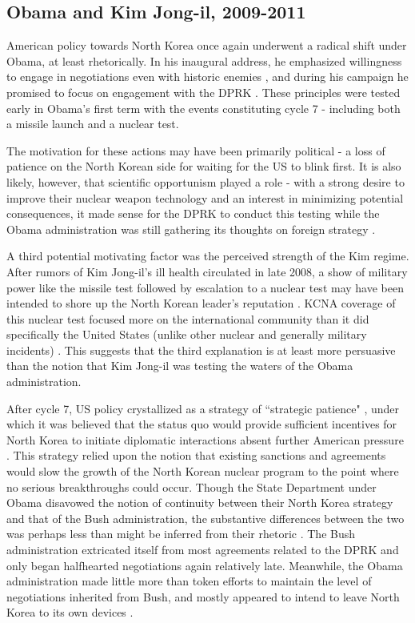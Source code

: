 \documentclass{article}
\begin{document}
\subsection{Obama and Kim Jong-il, 2009-2011}

American policy towards North Korea once again underwent a radical shift under Obama, at least rhetorically. In his inaugural address, he emphasized willingness to engage in negotiations even with historic enemies \cite{obama}, and during his campaign he promised to focus on engagement with the DPRK \cite{delury}. These principles were tested early in Obama's first term with the events constituting cycle 7 - including both a missile launch and a nuclear test.

The motivation for these actions may have been primarily political - a loss of patience on the North Korean side for waiting for the US to blink first. It is also likely, however, that scientific opportunism played a role - with a strong desire to improve their nuclear weapon technology and an interest in minimizing potential consequences, it made sense for the DPRK to conduct this testing while the Obama administration was still gathering its thoughts on foreign strategy \cite{hecker2}.

A third potential motivating factor was the perceived strength of the Kim regime. After rumors of Kim Jong-il's ill health circulated in late 2008, a show of military power like the missile test followed by escalation to a nuclear test may have been intended to shore up the North Korean leader's reputation \cite{hecker2}. KCNA coverage of this nuclear test focused more on the international community than it did specifically the United States (unlike other nuclear and generally military incidents) \cite{sin}. This suggests that the third explanation is at least more persuasive than the notion that Kim Jong-il was testing the waters of the Obama administration.

After cycle 7, US policy crystallized as a strategy of ``strategic patience" \cite{crs13}, under which it was believed that the status quo would provide sufficient incentives for North Korea to initiate diplomatic interactions absent further American pressure \cite{snyder2}. This strategy relied upon the notion that existing sanctions and agreements would slow the growth of the North Korean nuclear program to the point where no serious breakthroughs could occur. Though the State Department under Obama disavowed the notion of continuity between their North Korea strategy and that of the Bush administration, the substantive differences between the two was perhaps less than might be inferred from their rhetoric \cite{delury}. The Bush administration extricated itself from most agreements related to the DPRK and only began halfhearted negotiations again relatively late. Meanwhile, the Obama administration made little more than token efforts to maintain the level of negotiations inherited from Bush, and mostly appeared to intend to leave North Korea to its own devices \cite{delury}.
\end{document}
